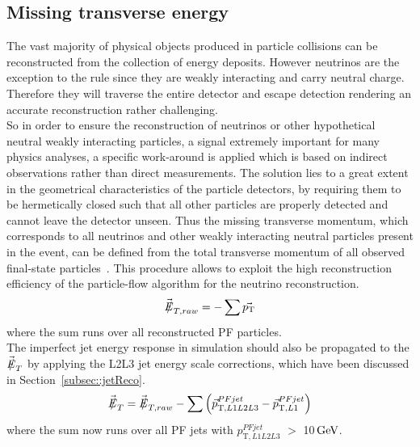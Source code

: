 \subsection{Missing transverse energy}\label{subsec::MET}

The vast majority of physical objects produced in particle collisions can be reconstructed from the collection of energy deposits. 
However neutrinos are the exception to the rule since they are weakly interacting and carry neutral charge. Therefore they will traverse the entire detector and escape detection rendering an accurate reconstruction rather challenging.
\\
So in order to ensure the reconstruction of neutrinos or other hypothetical neutral weakly interacting particles, a signal extremely important for many physics analyses, a specific work-around is applied which is based on indirect observations rather than direct measurements. The solution lies to a great extent in the geometrical characteristics of the particle detectors, by requiring them to be hermetically closed such that all other particles are properly detected and cannot leave the detector unseen.
Thus the missing transverse momentum, which corresponds to all neutrinos and other weakly interacting neutral particles present in the event, can be defined from the total transverse momentum of all observed final-state particles~\cite{METReco}. This procedure allows to exploit the high reconstruction efficiency of the particle-flow algorithm for the neutrino reconstruction.
\begin{equation}
 \vecmetRaw = - \sum \vec{\pT}
\end{equation}
where the sum runs over all reconstructed PF particles.
\\
The imperfect jet energy response in simulation should also be propagated to the $\vecmet$ by applying the L2L3 jet energy scale corrections, which have been discussed in Section~\ref{subsec::jetReco}.
\begin{equation}
 \vecmet = \vecmetRaw - \sum \left( \vec{p}_{\textrm{T},L1L2L3}^{PFjet} - \vec{p}_{\textrm{T},L1}^{PFjet} \right)
\end{equation}
where the sum now runs over all PF jets with $p_{\textrm{T},L1L2L3}^{PFjet}$ $>$ 10$\, \mathrm{GeV}$.
